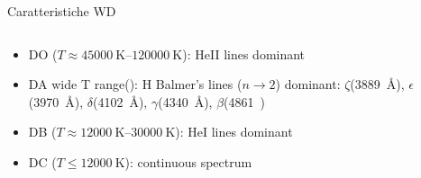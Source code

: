 \begin{frame}{Caratteristiche WD}
\begin{columns}[T]
\begin{column}{0.5\textwidth}
\begin{figure}[!ht]
\end{figure}
\begin{itemize}
    \item DO ($T\approx\SIrange{45000}{120000}{\kelvin}$): HeII lines dominant
    \item DA wide T range(): H Balmer's lines ($n\to2$) dominant: $\zeta$(\SI{3889}{\angstrom}), $\epsilon$(\SI{3970}{\angstrom}), $\delta$(\SI{4102}{\angstrom}), $\gamma$(\SI{4340}{\angstrom}), $\beta$(\SI{4861})
    \item DB ($T\approx\SIrange{12000}{30000}{\kelvin}$): HeI lines dominant
    \item DC ($T\leq\SI{12000}{\kelvin}$): continuous spectrum
\end{itemize}
            
        \end{column}
    \end{columns}
    
\end{frame}

